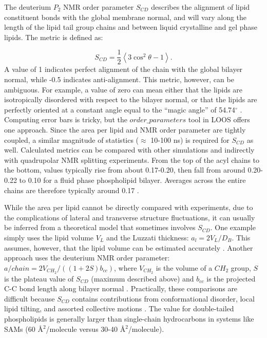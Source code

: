 \documentclass[9pt,bestpractices]{livecoms}
\begin{document}
The deuterium $P_2$ NMR order parameter $S_{CD}$ describes the alignment of lipid constituent bonds with the global membrane normal, and will vary along the length of the lipid tail group chains and between liquid crystalline and gel phase lipids.
The metric is defined as:

\begin{equation}\label{eq:6}
	S_{CD}=\frac{1}{2} \left<3\cos^2\theta-1 \right>.
\end{equation}
A value of 1 indicates perfect alignment of the chain with the global bilayer normal, while -0.5 indicates anti-alignment.
This metric, however, can be ambiguous.
For example, a value of zero can mean either that the lipids are isotropically disordered with respect to the bilayer normal, or that the lipids are perfectly oriented at a constant angle equal to the ``magic angle'' of 54.74$^{\circ}$ \cite{Poger2016}.
Computing error bars is tricky, but the $order\_parameters$ tool in LOOS offers one approach.
Since the area per lipid and NMR order parameter are tightly coupled, a similar magnitude of statistics ($\approx$ 10-100 ns) is required for $S_{CD}$ as well.
Calculated metrics can be compared with other simulations and indirectly with quadrupolar NMR splitting experiments.
From the top of the acyl chains to the bottom, values typically rise from about 0.17-0.20, then fall from around 0.20-0.22 to 0.10 for a fluid phase phospholipid bilayer.
Averages across the entire chains are therefore typically around 0.17 \cite{Venable2015}.

While the area per lipid cannot be directly compared with experiments, due to the complications of lateral and transverse structure fluctuations, it can usually be inferred from a theoretical model that sometimes involves $S_{CD}$.
One example simply uses the lipid volume $V_L$ and the Luzzati thickness: $a_l=2V_L/D_B$.
This assumes, however, that the lipid volume can be estimated accurately \cite{Poger2016}.
Another approach uses the deuterium NMR order parameter: $a/chain=2V_{CH_2}/((1+2S)b_{cc})$, where $V_{CH_2}$ is the volume of a $CH_2$ group, $S$ is the plateau value of $S_{CD}$ (maximum described above) and $b_{cc}$ is the projected C-C bond length along bilayer normal \cite{Nagle1993}.
Practically, these comparisons are difficult because $S_{CD}$ contains contributions from conformational disorder, local lipid tilting, and assorted collective motions \cite{Venable2015}.
The value for double-tailed phospholipids is generally larger than single-chain hydrocarbons in systems like SAMs (60 \AA$^2$/molecule versus 30-40 \AA$^2$/molecule).
\end{document}
